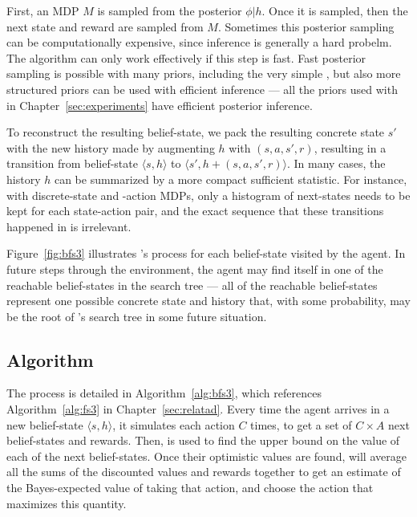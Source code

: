 First, an MDP $M$ is sampled from the posterior $\phi|h$. Once it is sampled, then the next state and reward are sampled from $M$. Sometimes this posterior sampling can be computationally expensive, since inference is generally a hard probelm. The  algorithm can only work effectively if this step is fast. Fast posterior sampling is possible with many priors, including the very simple , but also more structured priors can be used with efficient inference --- all the priors used with  in Chapter~\ref{sec:experiments} have efficient posterior inference.

To reconstruct the resulting belief-state, we pack the resulting concrete state $s'$ with the new history made by augmenting $h$ with $(s, a, s', r)$, resulting in a transition from belief-state $\langle s, h\rangle$ to $\langle s', h + (s,a,s',r)\rangle$.  In many cases, the history $h$ can be summarized by a more compact sufficient statistic. For instance, with discrete-state and -action MDPs, only a histogram of next-states needs to be kept for each state-action pair, and the exact sequence that these transitions happened in is irrelevant.

Figure~\ref{fig:bfs3} illustrates 's process for each belief-state visited by the agent. In future steps through the environment, the agent may find itself in one of the reachable belief-states in the search tree --- all of the reachable belief-states represent one possible concrete state and history that, with some probability, may be the root of 's search tree in some future situation. 

\subsection{Algorithm}

The  process is detailed in Algorithm~\ref{alg:bfs3}, which references Algorithm~\ref{alg:fs3} in Chapter~\ref{sec:relatad}. Every time the agent arrives in a new belief-state $\langle s, h\rangle$, it simulates each action $C$ times, to get a set of $C \times A$ next belief-states and rewards. Then,  is used to find the upper bound on the value of each of the next belief-states. Once their optimistic values are found,  will average all the sums of the discounted values and rewards together to get an estimate of the Bayes-expected value of taking that action, and choose the action that maximizes this quantity.

